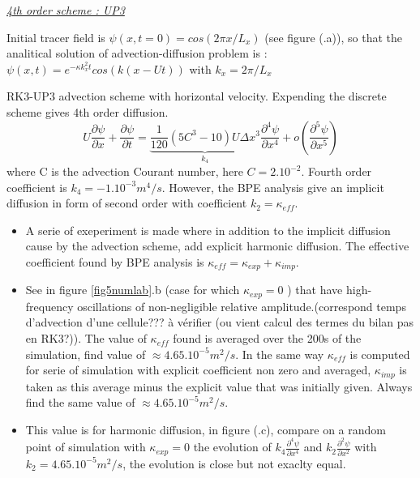 \underline{\textit{4th order scheme : UP3}}

Initial tracer field is $\psi(x,t=0)=cos(2\pi x/L_x)$ (see figure (.a)), so that the analitical solution of advection-diffusion problem is : $\psi(x,t)=e^{-\kappa k_x^2 t}cos(k(x-Ut))$ with $k_x=2\pi/L_x$

RK3-UP3 advection scheme with horizontal velocity. Expending the discrete scheme gives 4th order diffusion.
\begin{equation}
U \frac{\partial \psi}{\partial x} +\frac{\partial \psi}{\partial t} = \underbrace{\frac{1}{120}(5 C^3-10) U \Delta x^3}_{k_4}  \frac{\partial^4 \psi}{\partial x^4} + o(\frac{\partial^5 \psi}{\partial x^5})
\end{equation}
where C is the advection Courant number, here $C=2 . 10^{-2}$. Fourth order coefficient is $k_4=-1.10^{-3} m^4/s$. However, the BPE analysis give an implicit diffusion in form of second order with coefficient $k_2=\kappa_{eff}$.

\begin{itemize}
\item A serie of exeperiment is made where in addition to the implicit diffusion cause by the advection scheme, add explicit harmonic diffusion. The effective coefficient found by BPE analysis is $\kappa_{eff} = \kappa_{exp} + \kappa_{imp}$.
\item See in figure \ref{fig5numlab}.b (case for which $\kappa_{exp}=0$ ) that have high-frequency oscillations of non-negligible relative amplitude.\color{red}(correspond temps d'advection d'une cellule??? à vérifier (ou vient calcul des termes du bilan pas en RK3?))\color{black}. The value of $\kappa_{eff}$ found is averaged over the 200s of the simulation, find value of $\approx 4.65.10^{-5} m^2/s$. In the same way $\kappa_{eff}$ is computed for serie of simulation with explicit coefficient non zero and averaged, $\kappa_{imp}$ is taken as this average minus the explicit value that was initially given. Always find the same value of  $\approx 4.65.10^{-5} m^2/s$.
\item This value is for harmonic diffusion, in figure (.c), compare on a random point of simulation with $\kappa_{exp}=0$ the evolution of $k_4 \frac{\partial^4 \psi}{\partial x^4}$ and $k_2 \frac{\partial^2 \psi}{\partial x^2}$ with $k_2=4.65.10^{-5} m^2/s$, the evolution is close but not exaclty equal.
\end{itemize}



